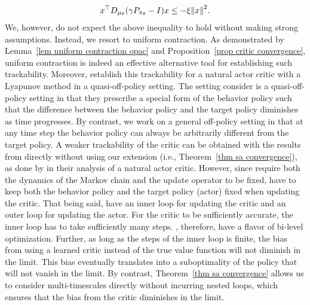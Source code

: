 \documentclass[twoside,11pt]{article}
\numberwithin{assucounter}{section}
\begin{document}
\begin{align}
  x^\top D_{\mu_\theta}(\gamma P_{\pi_\theta} - I) x \leq -\xi \norm{x}^2.
\end{align}
We,
however,
do not expect the above inequality to hold without making strong assumptions.
Instead,
we resort to uniform contraction.
As demonstrated by Lemma~\ref{lem uniform contraction opac} and Proposition~\ref{prop critic convergence},
uniform contraction is indeed an effective alternative tool for establishing such trackability.
Moreover,
\citet{khodadadian2021finitesample} establish this trackability for a natural actor critic \citep{kakade2001natural} with a Lyapunov method in a quasi-off-policy setting.
The setting \citet{khodadadian2021finitesample} consider is a quasi-off-policy setting in that they prescribe a special form of the behavior policy such that the difference between the behavior policy and the target policy diminishes as time progresses.
By contrast,
we work on a general off-policy setting in that at any time step the behavior policy can always be arbitrarily different from the target policy.
A weaker trackability of the critic can be obtained with the results from \citet{chen2021lyapunov} directly without using our extension (i.e., Theorem~\ref{thm sa convergence}),
as done by \citet{chen2021finitesample,khodadadian2021finite} in their analysis of a natural actor critic.
However,
since \citet{chen2021lyapunov} require both the dynamics of the Markov chain and the update operator to be fixed,
\citet{chen2021finitesample,khodadadian2021finite}
have to keep both the behavior policy and the target policy (actor) fixed when updating the critic.
That being said,
\citet{chen2021finitesample,khodadadian2021finite}
have an inner loop for updating the critic and an outer loop for updating the actor. 
For the critic to be sufficiently accurate,
the inner loop has to take sufficiently many steps.
\citet{chen2021finitesample,khodadadian2021finite}, therefore, have a flavor of bi-level optimization.
Further, 
as long as the steps of the inner loop is finite,
the bias from using a learned critic instead of the true value function will not diminish in the limit.
This bias eventually translates into a suboptimality of the policy that will not vanish in the limit.
By contrast,
Theorem~\ref{thm sa convergence} allows us to consider multi-timescales directly without incurring nested loops,
which ensures that the bias from the critic diminishes in the limit. 
\end{document}
